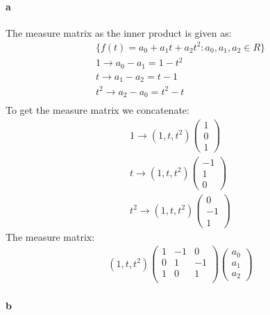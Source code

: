 \paragraph*{a}
The measure matrix as the inner product is given as: 
\begin{gather*}
\{ f(t) = a_0 + a_1 t + a_2 t^2 : a_0,a_1,a_2 \in R \}\\
1 \rightarrow a_0 - a_1 = 1-t^2 \\
t \rightarrow a_1 - a_2 = t-1 \\
t^2 \rightarrow a_2 - a_0 = t^2 -t \\
\end{gather*}
To get the measure matrix we concatenate:
\begin{gather*}
1 \rightarrow \left( 1 , t , t^2 \right)
\left(
\begin{array}{c}
1 \\ 0 \\ 1
\end{array} \right) \\
t \rightarrow \left( 1 , t , t^2 \right)
\left(
\begin{array}{c}
-1 \\ 1 \\ 0
\end{array} \right) \\
t^2 \rightarrow
\left( 1 , t , t^2 \right)
\left(
\begin{array}{c}
0 \\ -1 \\ 1
\end{array} \right)
\end{gather*}
The measure matrix:
\begin{gather*}
\left( 1 , t , t^2 \right)
\left( \begin{array}{ccc}
1 & -1 & 0\\
0 & 1 & -1 \\
1 & 0 & 1 \\
\end{array} \right)
\left( \begin{array}{c}
a_0\\ a_1 \\ a_2
\end{array} \right)
\end{gather*}

\paragraph*{b}